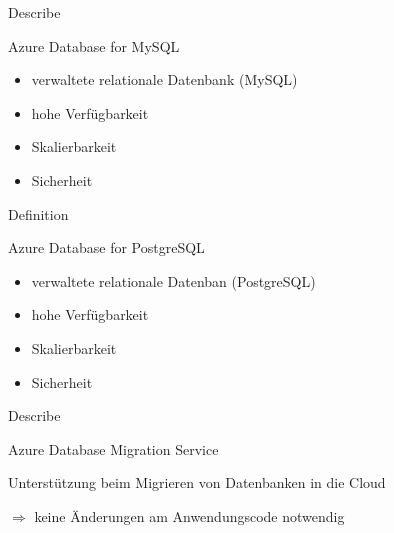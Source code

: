 \documentclass{scrartcl}
\newenvironment{flashcard}[2][]{%
    #1
    \vfill
    \centerline{\Large{#2}}
    \vfill
\newpage
}
{\newpage}
\begin{document}
    \begin{flashcard}[Describe]{Azure Database for MySQL}
        \begin{itemize}
            \item verwaltete relationale Datenbank (MySQL)
            \item hohe Verfügbarkeit
            \item Skalierbarkeit
            \item Sicherheit
        \end{itemize}
    \end{flashcard}

    \begin{flashcard}[Definition]{Azure Database for PostgreSQL}
        \begin{itemize}
            \item verwaltete relationale Datenban (PostgreSQL)
            \item hohe Verfügbarkeit
            \item Skalierbarkeit
            \item Sicherheit
        \end{itemize}
    \end{flashcard}

    \begin{flashcard}[Describe]{Azure Database Migration Service}
        Unterstützung beim Migrieren von Datenbanken in die Cloud

        $\Rightarrow$ keine Änderungen am Anwendungscode notwendig
    \end{flashcard}
\end{document}
